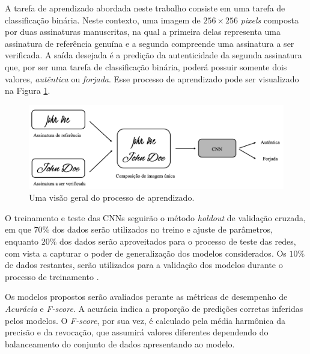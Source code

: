 

A tarefa de aprendizado abordada neste trabalho consiste em uma tarefa de classificação binária. Neste contexto, uma imagem de $256 \times 256$ \emph{pixels} composta por duas assinaturas manuscritas, na qual a primeira delas representa uma assinatura de referência genuína e a segunda compreende uma assinatura a ser verificada. A saída desejada é a predição da autenticidade da segunda assinatura que, por ser uma tarefa de classificação binária, poderá possuir somente dois valores, \emph{autêntica} ou \emph{forjada}. Esse processo de aprendizado pode ser visualizado na Figura \ref{fig:esquema-solucao}.

\begin{figure}[h!]
  \centering
  \caption{Uma visão geral do processo de aprendizado.}
  \label{fig:esquema-solucao}
  \includegraphics[width=\textwidth]{imgs/esquema-solucao}
\end{figure}

O treinamento e teste das CNNs seguirão o método \emph{holdout} de validação cruzada, em que $70\%$ dos dados serão utilizados no treino e ajuste de parâmetros, enquanto $20\%$ dos dados serão aproveitados para o processo de teste das redes, com vista a capturar o poder de generalização dos modelos considerados. Os $10\%$ de dados restantes, serão utilizados para a validação dos modelos durante o processo de treinamento \cite{brink}.

Os modelos propostos serão avaliados perante as métricas de desempenho de \emph{Acurácia} e \emph{F-score}. A acurácia indica a proporção de predições corretas inferidas pelos modelos. O \emph{F-score}, por sua vez, é calculado pela média harmônica da precisão e da revocação, que assumirá valores diferentes dependendo do balanceamento do conjunto de dados apresentando ao modelo.

